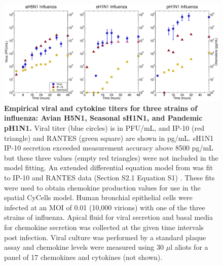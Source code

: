 \documentclass[10pt]{article}
\begin{document}
\begin{figure}[!ht]
\begin{center}
 \includegraphics[width=\textwidth]{Figure_3}
 \end{center}
\caption{{\bf Empirical viral and cytokine titers for three strains of influenza: Avian H5N1, Seasonal sH1N1, and Pandemic pH1N1.}  Viral titer (blue circles) is in PFU/mL, and IP-10 (red triangle) and RANTES (green square) are shown in pg/mL.   sH1N1 IP-10 secretion exceeded measurement accuracy above 8500 pg/mL but these three values (empty red triangles) were not included in the model fitting.  An extended differential equation model from \cite{Mitchell2011} was fit to IP-10 and RANTES data (Section S2.1 Equation S1) .  These fits were used to obtain chemokine production values for use in the spatial CyCells model.  Human bronchial epithelial cells were infected at an MOI of 0.01 (10,000 virions) with one of the three strains of influenza.  Apical fluid for viral secretion and basal media for chemokine secretion was collected at the given time intervals post infection.  Viral culture was performed by a standard plaque assay and chemokine levels were measured using 30 $\mu$l aliots for a panel of 17 chemokines and cytokines (not shown).} 
 \label{fig:data}
\end{figure}
\end{document}
